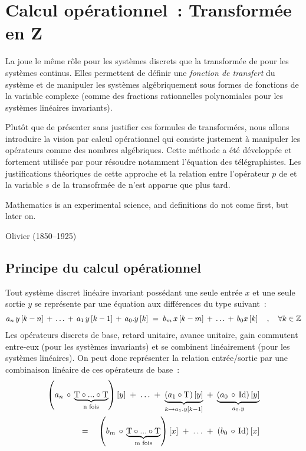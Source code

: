 \section{Calcul opérationnel~: Transformée en Z}

La \teZ{} joue le même rôle pour les systèmes discrets que la
transformée de \Laplace{} pour les systèmes continus. Elles permettent
de définir une \emph{fonction de transfert} du système et de manipuler
les systèmes algébriquement sous formes de fonctions de la variable
complexe (comme des fractions rationnelles polynomiales pour les
systèmes linéaires invariants).

Plutôt que de présenter sans justifier ces formules de transformées,
nous allons introduire la vision par calcul opérationnel qui consiste
justement à manipuler les opérateurs comme des nombres
algébriques. Cette méthode a été développée et fortement utilisée par
\Heaviside{} pour résoudre notamment l'équation des
télégraphistes. Les justifications théoriques de cette approche et la
relation entre l'opérateur $p$ de \Heaviside{} et la variable $s$ de
la transofrmée de \Laplace{} n'est apparue que plus tard.

\begin{citations} Mathematics is an experimental science, and definitions do not come
  first, but later on.

  \hfill Olivier \Heaviside{} (1850--1925)
\end{citations}

\subsection{Principe du calcul opérationnel}
\label{sec:calcul_operationnel}
Tout système discret linéaire invariant possédant une seule entrée $x$ et
une seule sortie $y$ se représente par une équation aux différences du
type suivant~:
\begin{eqnarray}
  \label{eq:systeme_recurrence}
  a_n\,y\left[k-n\right] \,+\, \ldots  \,+\,  a_1\,y\left[k-1\right] \,+\, a_0.y\left[k\right] \;=\; b_m\,x\left[k-m\right] \,+\, \ldots \,+\, b_0 x\left[k\right] \quad,\quad \forall k\in\mathbb{Z}
\end{eqnarray}
Les opérateurs discrets de base, retard unitaire, avance unitaire,
gain commutent entre-eux (pour les systèmes invariants) et se combinent
linéairement (pour les systèmes linéaires). On peut donc représenter la
relation entrée/sortie par une combinaison linéaire de ces opérateurs
de base~:
\begin{eqnarray}
  \label{eq:systeme_operationnel}
  \left(a_n\,\circ\,\underbrace{\mathrm{T}\circ...\circ \mathrm{T}}_{\text{n fois}}\right)\left[y\right]\; +\; \ldots \;+\; \underbrace{\left(a_1\circ\mathrm{T}\right)\left[y\right]}_{k\mapsto a_1.y\left[k-1\right]} \;+\; \underbrace{\left(a_0 \,\circ\, \mathrm{Id}\right)\left[y\right]}_{a_0.y} \\
  =\quad \left(b_m\,\circ\,\underbrace{\mathrm{T}\circ...\circ \mathrm{T}}_{\text{m fois}}\right)\left[x\right] \;+\; \ldots \;+\; \left(b_0 \,\circ\,\mathrm{Id}\right)\left[x\right]
\end{eqnarray}

